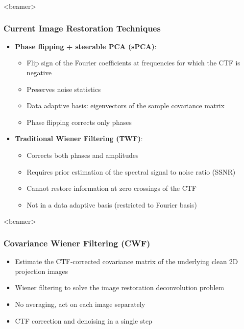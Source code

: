 \documentclass{beamer}
\begin{document}
\begin{frame}<beamer>
\frametitle{Current Image Restoration Techniques}
\begin{itemize}[]
 \item \textbf{Phase flipping + steerable PCA (sPCA)}: 
  \begin{itemize}
  \item  Flip sign of the Fourier
coefficients at frequencies for which the CTF is negative
   \item Preserves noise statistics
   \item Data adaptive basis: eigenvectors of the sample covariance matrix
   \item Phase flipping corrects only phases
  \end{itemize}
 \item \textbf{Traditional Wiener Filtering (TWF)}:
 \begin{itemize}
  \item  Corrects both phases and amplitudes
  \item Requires prior estimation of the spectral signal to
 noise ratio (SSNR)
  \item  Cannot restore information at zero crossings of the CTF
  \item Not in a data adaptive basis (restricted to Fourier basis)
 \end{itemize}
\end{itemize}
\end{frame}

\begin{frame}<beamer>
\frametitle{Covariance Wiener Filtering (CWF)}
\begin{itemize}[]
 \item Estimate the CTF-corrected covariance matrix of the
underlying clean 2D projection images
\item Wiener filtering to solve the image restoration deconvolution problem
\item No averaging, act on each image separately
\item CTF correction and denoising in a single step
\end{itemize}
\end{frame}
\end{document}
